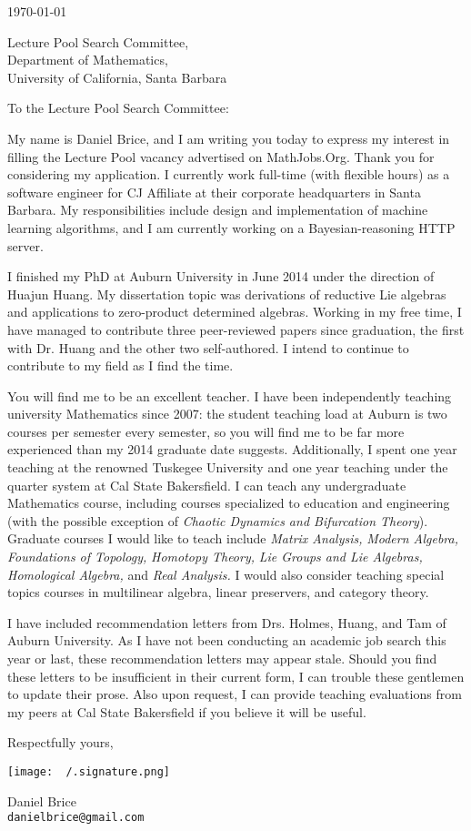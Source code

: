 \documentclass[11pt]{article}
\begin{document}
\makeletterhead

\vfill

\today

\vfill

Lecture Pool Search Committee,\\
Department of Mathematics,\\
University of California, Santa Barbara

\vfill

To the Lecture Pool Search Committee:

\vfill

My name is Daniel Brice, and I am writing you today to express my interest in filling the Lecture Pool vacancy advertised on MathJobs.Org. Thank you for considering my application. I currently work full-time (with flexible hours) as a software engineer for CJ Affiliate at their corporate headquarters in Santa Barbara. My responsibilities include design and implementation of machine learning algorithms, and I am currently working on a Bayesian-reasoning HTTP server.

I finished my PhD at Auburn University in June 2014 under the direction of Huajun Huang. My dissertation topic was derivations of reductive Lie algebras and applications to zero-product determined algebras. Working in my free time, I have managed to contribute three peer-reviewed papers since graduation, the first with Dr. Huang and the other two self-authored. I intend to continue to contribute to my field as I find the time.

You will find me to be an excellent teacher. I have been independently teaching university Mathematics since 2007: the student teaching load at Auburn is two courses per semester every semester, so you will find me to be far more experienced than my 2014 graduate date suggests. Additionally, I spent one year teaching at the renowned Tuskegee University and one year teaching under the quarter system at Cal State Bakersfield. I can teach any undergraduate Mathematics course, including courses specialized to education and engineering (with the possible exception of \emph{Chaotic Dynamics and Bifurcation Theory}). Graduate courses I would like to teach include \emph{Matrix Analysis,} \emph{Modern Algebra,} \emph{Foundations of Topology,} \emph{Homotopy Theory,} \emph{Lie Groups and Lie Algebras,} \emph{Homological Algebra,} and \emph{Real Analysis.} I would also consider teaching special topics courses in multilinear algebra, linear preservers, and category theory.

I have included recommendation letters from Drs. Holmes, Huang, and Tam of Auburn University. As I have not been conducting an academic job search this year or last, these recommendation letters may appear stale. Should you find these letters to be insufficient in their current form, I can trouble these gentlemen to update their prose. Also upon request, I can provide teaching evaluations from my peers at Cal State Bakersfield if you believe it will be useful.

\vfill

Respectfully yours,

\texttt{[image: ~/.signature.png]}

Daniel Brice\\
\texttt{danielbrice@gmail.com}

\label{page:last}
\end{document}

